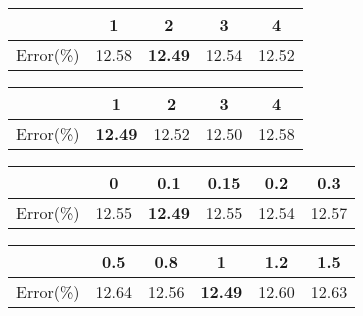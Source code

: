 \documentclass[runningheads]{llncs}
\begin{document}
  \begin{table*}[tb]
    \begin{minipage}[t]{0.475\textwidth}
    \centering\small
        \caption{ Results with different Transformer decoder layers  for IC-MLM. We fix  as 1.}
        \label{table:ablation:Llbl}
          \renewcommand\tabcolsep{3pt}
          \begin{tabular}{lcccc}
            \toprule
             &  1 &  2 & 3 & 4 \\
            \midrule
            Error(\%) &  12.58 & \textbf{12.49} & 12.54 & 12.52 \\
            \bottomrule
            \end{tabular}
    \end{minipage}
  \hfill
    \begin{minipage}[t]{0.475\textwidth}
    \centering\small
        \caption{Results with different Transformer decoder layers  for attribute query network. We fix  as 2.}
        \label{table:ablation:Latr}
          \renewcommand\tabcolsep{3pt}
          \begin{tabular}{lcccc}
            \toprule
             &  1 &  2 & 3 & 4 \\
            \midrule
            Error(\%) & \textbf{12.49} & 12.52 & 12.50 & 12.58 \\
            \bottomrule
            \end{tabular}
    \end{minipage}
  \end{table*}
  

\begin{table*}[tb]
  \begin{minipage}[t]{0.475\textwidth}
  \centering\small
      \caption{
        Results on the LFWA dataset with different mask ratios . 
      }
      \label{table:ablation:alpha}
        \renewcommand\tabcolsep{1pt}
        \begin{tabular}{lccccc}
          \toprule
           & 0 &  0.1 & 0.15 & 0.2 &  0.3 \\
          \midrule
           Error(\%) & 12.55 & \textbf{12.49} & 12.55 & 12.54 & 12.57 \\
          \bottomrule
          \end{tabular}
  \end{minipage}
\hfill
  \begin{minipage}[t]{0.475\textwidth}
  \centering
      \caption{
        Results on the LFWA dataset with different coefficients .
      }
      \label{table:ablation:lambda}
        \renewcommand\tabcolsep{1pt}
        \begin{tabular}{lccccc}
          \toprule
           & 0.5 &  0.8 & 1 & 1.2 &  1.5 \\
          \midrule
           Error(\%) & 12.64 & 12.56 & \textbf{12.49} & 12.60 & 12.63 \\
          \bottomrule
          \end{tabular}
  \end{minipage}
\end{table*}
\end{document}
